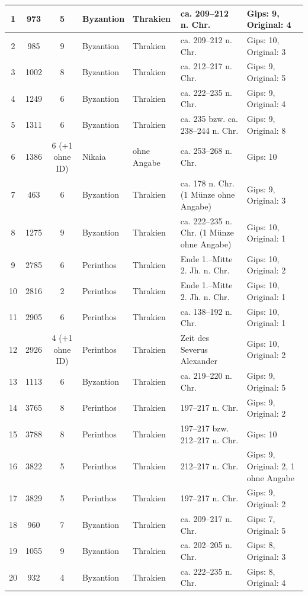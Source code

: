 \begin{landscape}
\begin{longtable}{
    |c|
    |c|
    |c|
    |p{2.5cm}|
    |p{2.2cm}|
    |p{2.5cm}|
    |p{2.5cm}|
}
    1  & 973  & 5              & Byzantion & Thrakien    & ca. 209--212 n. Chr. & Gips: 9, Original: 4\\ \hline
    2  & 985  & 9              & Byzantion & Thrakien    & ca. 209--212 n. Chr. & Gips: 10, Original: 3\\ \hline
    3  & 1002 & 8              & Byzantion & Thrakien    & ca. 212--217 n. Chr. & Gips: 9, Original: 5\\ \hline
    4  & 1249 & 6              & Byzantion & Thrakien    & ca. 222--235 n. Chr. & Gips: 9, Original: 4\\ \hline
    5  & 1311 & 6              & Byzantion & Thrakien    & ca. 235 bzw. ca. 238--244 n. Chr. & Gips: 9, Original: 8\\ \hline
    6  & 1386 & 6 (+1 ohne ID) & Nikaia    & ohne Angabe & ca. 253--268 n. Chr. & Gips: 10\\ \hline
    7  & 463  & 6              & Byzantion & Thrakien    & ca. 178 n. Chr. (1 Münze ohne Angabe) & Gips: 9, Original: 3\\ \hline
    8  & 1275 & 9              & Byzantion & Thrakien    & ca. 222--235 n. Chr. (1 Münze ohne Angabe) & Gips: 10, Original: 1\\ \hline
    9  & 2785 & 6              & Perinthos & Thrakien    & Ende 1.--Mitte 2. Jh. n. Chr. & Gips: 10, Original: 2\\ \hline
    10 & 2816 & 2              & Perinthos & Thrakien    & Ende 1.--Mitte 2. Jh. n. Chr. & Gips: 10, Original: 1\\ \hline
    11 & 2905 & 6              & Perinthos & Thrakien    & ca. 138--192 n. Chr. & Gips: 10, Original: 1\\ \hline
    12 & 2926 & 4 (+1 ohne ID) & Perinthos & Thrakien    & Zeit des Severus Alexander & Gips: 10, Original: 2\\ \hline
    13 & 1113 & 6              & Byzantion & Thrakien    & ca. 219--220 n. Chr. & Gips: 9, Original: 5\\ \hline
    14 & 3765 & 8              & Perinthos & Thrakien    & 197--217 n. Chr. & Gips: 9, Original: 2\\ \hline
    15 & 3788 & 8              & Perinthos & Thrakien    & 197--217 bzw. 212--217 n. Chr. & Gips: 10\\ \hline
    16 & 3822 & 5              & Perinthos & Thrakien    & 212--217 n. Chr. & Gips: 9, Original: 2, 1 ohne Angabe\\ \hline
    17 & 3829 & 5              & Perinthos & Thrakien    & 197--217 n. Chr. & Gips: 9, Original: 2\\ \hline
    18 & 960  & 7              & Byzantion & Thrakien    & ca. 209--217 n. Chr. & Gips: 7, Original: 5\\ \hline
    19 & 1055 & 9              & Byzantion & Thrakien    & ca. 202--205 n. Chr. & Gips: 8, Original: 3\\ \hline
    20 & 932  & 4              & Byzantion & Thrakien    & ca. 222--235 n. Chr. & Gips: 8, Original: 4\\ \hline


\end{longtable}
\end{landscape}
